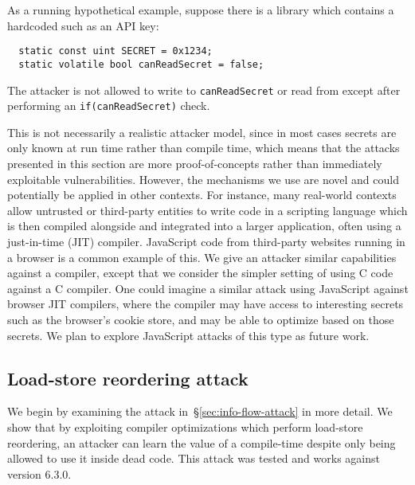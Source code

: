 As a running hypothetical example, suppose there is a library which contains
a hardcoded {\SEC} such as an API key:
\begin{verbatim}
  static const uint SECRET = 0x1234;
  static volatile bool canReadSecret = false;
\end{verbatim}
The attacker is not allowed to write to \verb|canReadSecret| or read from {\SEC}
except after performing an \verb|if(canReadSecret)| check.

This is not necessarily a realistic attacker model,
since in most cases secrets are only known at run time rather than compile time,
which means that the attacks presented in this section
are more proof-of-concepts rather than immediately exploitable vulnerabilities.
However, the mechanisms we use are novel and could potentially be applied
in other contexts.
For instance, many real-world contexts allow untrusted or
third-party entities to write code in a scripting language which is then
compiled alongside and integrated into a larger application, often
using a just-in-time (JIT) compiler.
JavaScript code from third-party websites running in a browser is a common
example of this.
We give an attacker similar capabilities against a
compiler, except that we consider the simpler setting of using C code against a C
compiler.
One could imagine a similar attack using JavaScript against browser JIT
compilers, where the compiler may have access to interesting secrets such as the
browser's cookie store, and may be able to optimize based on those secrets.
We plan to explore JavaScript attacks of this type as future work.

\subsection{Load-store reordering attack}
\label{subsec:exp-rel-mem}

We begin by examining the attack in~\S\ref{sec:info-flow-attack} in
more detail.
We show that by exploiting compiler optimizations which perform
load-store reordering, an attacker can learn the value of a compile-time
{\SEC} despite only being allowed to use it inside dead code.
This attack was tested and works against {\GCC} version 6.3.0.


